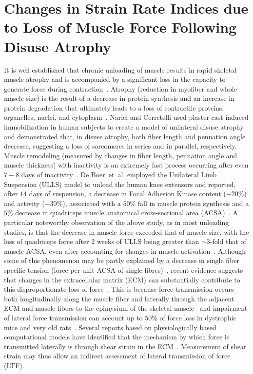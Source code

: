 \section {Changes in Strain Rate Indices due to Loss of Muscle Force Following Disuse Atrophy}
\label{sec: SR_ULLS}
It is well established that chronic unloading of muscle results in rapid skeletal muscle atrophy and is accompanied by a significant loss in the capacity to generate force during contraction~\cite{RNS1}. 
Atrophy (reduction in myofiber and whole muscle size) is the result of a decrease in protein synthesis and an increase in protein degradation that ultimately leads to a loss of contractile proteins, organelles, nuclei, and cytoplasm~\cite{RNS2, RNS3}. 
Narici and Cerretelli used plaster cast induced immobilization in human subjects to create a model of unilateral disuse atrophy~\cite{RNS4} and demonstrated that, in disuse atrophy, both fiber length and pennation angle decrease, suggesting a loss of sarcomeres in series and in parallel, respectively. 
Muscle remodeling (measured by changes in fiber length, pennation angle and muscle thickness) with inactivity is an extremely fast process occurring after even $7-8$ days of inactivity~\cite{RNS5, RNS6, RNS7}. 
De Boer~et~al. employed the Unilateral Limb Suspension (ULLS) model to unload the human knee extensors and reported, after $14$ days of suspension, a decrease in Focal Adhesion Kinase content ($-20\%$) and activity ($-30\%$), associated with a $50\%$ fall in muscle protein synthesis and a $5\%$ decrease in quadriceps muscle anatomical cross-sectional area (ACSA)~\cite{RNS8}.
A particular noteworthy observation of the above study, as in most unloading studies, is that the decrease in muscle force exceeded that of muscle size, with the loss of quadriceps force after $2$ weeks of ULLS being greater than $\sim 3$-fold that of muscle ACSA, even after accounting for changes in muscle activation~\cite{RNS8}. 
Although some of this phenomenon may be partly explained by a decrease in single fiber specific tension (force per unit ACSA of single fibres)~\cite{RNS9, RNS10}, recent evidence suggests that changes in the extracellular matrix (ECM) can substantially contribute to this disproportionate loss of force~\cite{RNIZhang}. 
This is because force transmission occurs both longitudinally along the muscle fiber and laterally through the adjacent ECM and muscle fibers to the epimysium of the skeletal muscle~\cite{RNS12, RNS13} and impairment of lateral force transmission can account up to $50\%$ of force loss in dystrophic mice and very old rats~\cite{RNIRamaswamy}. 
Several reports based on physiologically based computational models have identified that the mechanism by which force is transmitted laterally is through shear strain in the ECM~\cite{RNS15}. 
Measurement of shear strain may thus allow an indirect assessment of lateral transmission of force (LTF).

